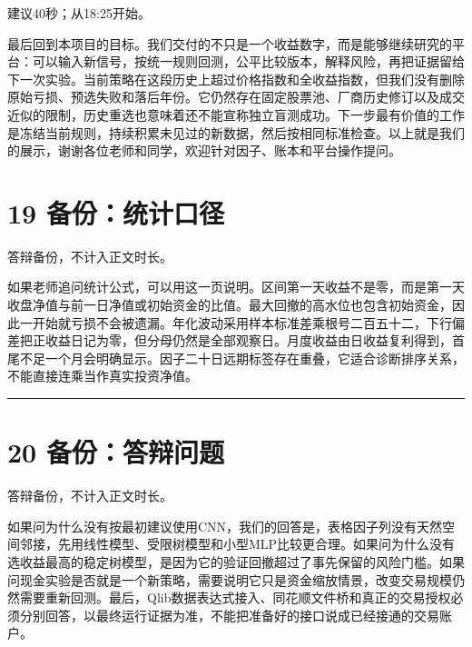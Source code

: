 \documentclass[UTF8,a4paper,12pt]{ctexart}
\begin{document}
{\small\color{accent}建议40秒；从18:25开始。}\par

最后回到本项目的目标。我们交付的不只是一个收益数字，而是能够继续研究的平台：可以输入新信号，按统一规则回测，公平比较版本，解释风险，再把证据留给下一次实验。当前策略在这段历史上超过价格指数和全收益指数，但我们没有删除原始亏损、预选失败和落后年份。它仍然存在固定股票池、厂商历史修订以及成交近似的限制，历史重选也意味着还不能宣称独立盲测成功。下一步最有价值的工作是冻结当前规则，持续积累未见过的新数据，然后按相同标准检查。以上就是我们的展示，谢谢各位老师和同学，欢迎针对因子、账本和平台操作提问。


\newpage
\section*{\color{ink}19  备份：统计口径}

{\small\color{accent}答辩备份，不计入正文时长。}\par

如果老师追问统计公式，可以用这一页说明。区间第一天收益不是零，而是第一天收盘净值与前一日净值或初始资金的比值。最大回撤的高水位也包含初始资金，因此一开始就亏损不会被遗漏。年化波动采用样本标准差乘根号二百五十二，下行偏差把正收益日记为零，但分母仍然是全部观察日。月度收益由日收益复利得到，首尾不足一个月会明确显示。因子二十日远期标签存在重叠，它适合诊断排序关系，不能直接连乘当作真实投资净值。


\vspace{6mm}\noindent\textcolor{accent!40}{\rule{\textwidth}{0.4pt}}\par

\section*{\color{ink}20  备份：答辩问题}

{\small\color{accent}答辩备份，不计入正文时长。}\par

如果问为什么没有按最初建议使用CNN，我们的回答是，表格因子列没有天然空间邻接，先用线性模型、受限树模型和小型MLP比较更合理。如果问为什么没有选收益最高的稳定树模型，是因为它的验证回撤超过了事先保留的风险门槛。如果问现金实验是否就是一个新策略，需要说明它只是资金缩放情景，改变交易规模仍然需要重新回测。最后，Qlib数据表达式接入、同花顺文件桥和真正的交易授权必须分别回答，以最终运行证据为准，不能把准备好的接口说成已经接通的交易账户。
\end{document}
